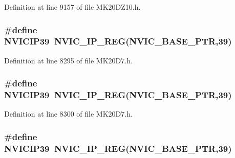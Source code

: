 Definition at line 9157 of file M\+K20\+D\+Z10.\+h.

\subsubsection[{\texorpdfstring{N\+V\+I\+C\+I\+P39}{NVICIP39}}]{\setlength{\rightskip}{0pt plus 5cm}\#define N\+V\+I\+C\+I\+P39~{\bf N\+V\+I\+C\+\_\+\+I\+P\+\_\+\+R\+EG}({\bf N\+V\+I\+C\+\_\+\+B\+A\+S\+E\+\_\+\+P\+TR},39)}\hypertarget{group___n_v_i_c___register___accessor___macros_ga9d1ad013432a1f36c55f289b6dcc796a}{}\label{group___n_v_i_c___register___accessor___macros_ga9d1ad013432a1f36c55f289b6dcc796a}


Definition at line 8295 of file M\+K20\+D7.\+h.

\subsubsection[{\texorpdfstring{N\+V\+I\+C\+I\+P39}{NVICIP39}}]{\setlength{\rightskip}{0pt plus 5cm}\#define N\+V\+I\+C\+I\+P39~{\bf N\+V\+I\+C\+\_\+\+I\+P\+\_\+\+R\+EG}({\bf N\+V\+I\+C\+\_\+\+B\+A\+S\+E\+\_\+\+P\+TR},39)}\hypertarget{group___n_v_i_c___register___accessor___macros_ga9d1ad013432a1f36c55f289b6dcc796a}{}\label{group___n_v_i_c___register___accessor___macros_ga9d1ad013432a1f36c55f289b6dcc796a}


Definition at line 8300 of file M\+K20\+D7.\+h.

\subsubsection[{\texorpdfstring{N\+V\+I\+C\+I\+P39}{NVICIP39}}]{\setlength{\rightskip}{0pt plus 5cm}\#define N\+V\+I\+C\+I\+P39~{\bf N\+V\+I\+C\+\_\+\+I\+P\+\_\+\+R\+EG}({\bf N\+V\+I\+C\+\_\+\+B\+A\+S\+E\+\_\+\+P\+TR},39)}\hypertarget{group___n_v_i_c___register___accessor___macros_ga9d1ad013432a1f36c55f289b6dcc796a}{}\label{group___n_v_i_c___register___accessor___macros_ga9d1ad013432a1f36c55f289b6dcc796a}


